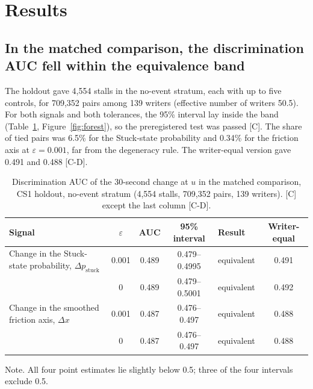 \section{Results}
\label{sec:results}

\subsection{In the matched comparison, the discrimination AUC fell within the equivalence band}
\label{sec:res-main}

The holdout gave 4,554 stalls in the no-event stratum, each with up to five controls, for 709,352 pairs among 139
writers (effective number of writers 50.5). For both signals and both tolerances, the 95\% interval lay inside the band
(Table~\ref{tab:main}, Figure~\ref{fig:forest}), so the preregistered test was passed [C]. The share of tied pairs was
6.5\% for the Stuck-state probability and 0.34\% for the friction axis at $\varepsilon = 0.001$, far from the
degeneracy rule. The writer-equal version gave 0.491 and 0.488 [C-D].

\begin{table}
  \caption{Discrimination AUC of the 30-second change at $u$ in the matched comparison, CS1 holdout, no-event stratum
  (4,554 stalls, 709,352 pairs, 139 writers). [C] except the last column [C-D].}
  \label{tab:main}
  \centering\small
  \begin{tabularx}{\linewidth}{>{\raggedright\arraybackslash}X c c c l c}
    \toprule
    Signal & $\varepsilon$ & AUC & 95\% interval & Result & Writer-equal \\
    \midrule
    Change in the Stuck-state probability, $\Delta p_{\mathrm{stuck}}$ & 0.001 & 0.489 & 0.479--0.4995 & equivalent & 0.491 \\
     & 0 & 0.489 & 0.479--0.5001 & equivalent & 0.492 \\
    Change in the smoothed friction axis, $\Delta x$ & 0.001 & 0.487 & 0.476--0.497 & equivalent & 0.488 \\
     & 0 & 0.487 & 0.476--0.497 & equivalent & 0.488 \\
    \bottomrule
  \end{tabularx}

  \smallskip
  \parbox{\linewidth}{\footnotesize Note. All four point estimates lie slightly below 0.5; three of the four intervals
  exclude 0.5.}
\end{table}

